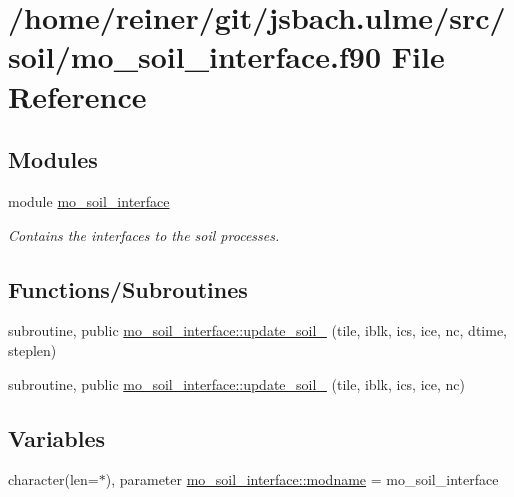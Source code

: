 \hypertarget{mo__soil__interface_8f90}{}\section{/home/reiner/git/jsbach.ulme/src/soil/mo\+\_\+soil\+\_\+interface.f90 File Reference}
\label{mo__soil__interface_8f90}
\subsection*{Modules}
\begin{DoxyCompactItemize}
\item 
module \hyperlink{namespacemo__soil__interface}{mo\+\_\+soil\+\_\+interface}
\begin{DoxyCompactList}\small\item\em Contains the interfaces to the soil processes. \end{DoxyCompactList}\end{DoxyCompactItemize}
\subsection*{Functions/\+Subroutines}
\begin{DoxyCompactItemize}
\item 
subroutine, public \hyperlink{namespacemo__soil__interface_ae4d0b6e8f65eeda1006776c05f071a85}{mo\+\_\+soil\+\_\+interface\+::update\+\_\+soil\+\_} (tile, iblk, ics, ice, nc, dtime, steplen)
\item 
subroutine, public \hyperlink{namespacemo__soil__interface_ac0a837dc7aabd46cf851cef036afaeda}{mo\+\_\+soil\+\_\+interface\+::update\+\_\+soil\+\_} (tile, iblk, ics, ice, nc)
\end{DoxyCompactItemize}
\subsection*{Variables}
\begin{DoxyCompactItemize}
\item 
character(len=$\ast$), parameter \hyperlink{namespacemo__soil__interface_a77346ad1827157005a696fc3bcb7c014}{mo\+\_\+soil\+\_\+interface\+::modname} = \textquotesingle{}mo\+\_\+soil\+\_\+interface\textquotesingle{}
\end{DoxyCompactItemize}
